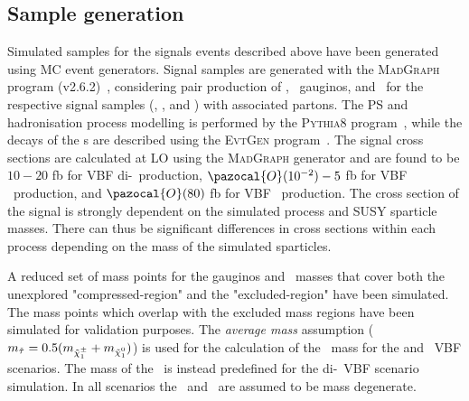 	\subsection{Sample generation}
	\label{subsec:vbfsample}
	Simulated samples for the signals events described above have been generated using \ac{MC} event generators. 
	Signal samples are generated with the \textsc{MadGraph} program (v2.6.2)~\cite{madgraph}, considering pair production of \chinoonepm, \ninotwo\ gauginos, and \stau\ for the respective signal samples (\chinoonepm\chinoonepm , \chinoonepm\ninotwo , and \stau\stau) with associated partons. 
	The \ac{PS} and hadronisation process modelling is performed by the \textsc{Pythia8} program~\cite{pythia8}, while the decays of the \ltau s are described using the \textsc{EvtGen} program~\cite{EvtGen2011}. 
	The signal cross sections are calculated at \ac{LO} using the \textsc{MadGraph} generator and are found to be $10-20$ fb for \ac{VBF} di-\stau\ production, $\pazocal{O}(10^{-2})-5$ fb for \ac{VBF} \chinoonepm\chinoonepm\ production, and $\pazocal{O}(80)$ fb for \ac{VBF} \chinoonepm\ninotwo\ production. 
	The cross section of the signal is strongly dependent on the simulated process and \ac{SUSY} sparticle masses. There can thus be significant differences in cross sections within each process depending on the mass of the simulated sparticles. 
	
	A reduced set of mass points for the gauginos and \stau\ masses that cover both the unexplored "compressed-region" and the "excluded-region" have been simulated. The mass points which overlap with the excluded mass regions have been simulated for validation purposes. 
	 The \textit{average mass} assumption ($m_{\stau}= 0.5(m_{\chinoonepm}+m_{\ninoone})$) is used for the calculation of the \stau\ mass for the \chinoonepm\chinoonepm and \chinoonepm\ninotwo\ \ac{VBF} scenarios. The mass of the \stau\ is instead predefined for the di-\stau\ \ac{VBF} scenario simulation.
	In all scenarios the \chinoonepm\ and \ninotwo\ are assumed to be mass degenerate.
	

